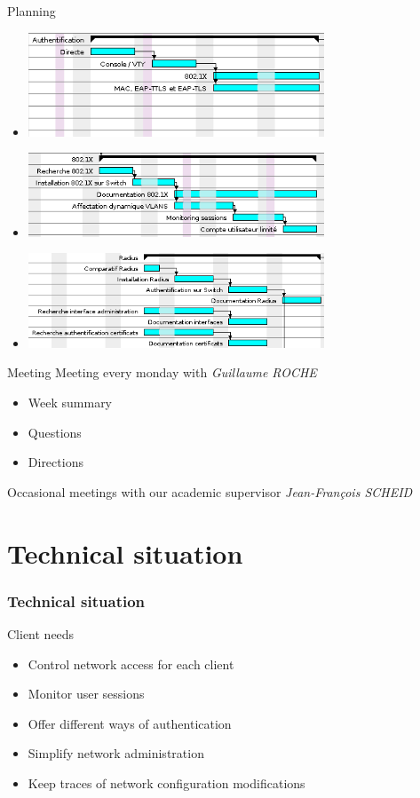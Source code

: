 \documentclass[12pt]{beamer}
\begin{document}
\begin{frame}{Planning}
    \begin{itemize}
	\item \includegraphics[width=250pt]{img/gantt_auth.png}
	\vfill
	\item \includegraphics[width=250pt]{img/gantt_dot1x.png}
	\vfill
	\item \includegraphics[width=250pt]{img/gantt_radius.png}
    \end{itemize}
\end{frame}


\begin{frame}{Meeting}
    Meeting every monday with \emph{Guillaume ROCHE}
    \vfill
    \begin{itemize}
	\item Week summary
	\item Questions 
	\item Directions 
    \end{itemize}
    \vfill
    Occasional meetings with our academic supervisor \emph{Jean-François SCHEID}
\end{frame}


\part{Technical situation}
\frame{\partpage}
\section{Technical situation}

\begin{frame}{Client needs}
    \begin{itemize}
	\item Control network access for each client
	\vfill
	\item Monitor user sessions
	\vfill 
	\item Offer different ways of authentication
	\vfill
	\item Simplify network administration
	\vfill
	\item Keep traces of network configuration modifications
    \end{itemize}
\end{frame}
\end{document}
